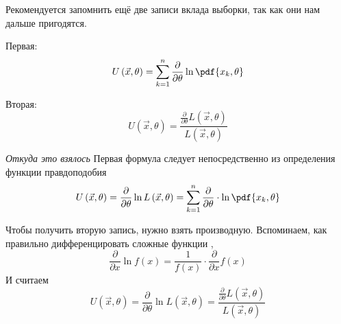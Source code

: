 \begin{remark}\label{remark:defU}
  Рекомендуется запомнить ещё две записи вклада выборки, так как они нам
  дальше пригодятся.

  Первая:
  \begin{align*}
    U\left( \vec{x},\theta \right)
    = \sum_{k=1}^n\frac{\partial}{\partial\theta}\ln{\pdf{x_k,\theta}}
  \end{align*}

  Вторая:
  $$U\left( \vec{x},\theta \right)
    = \frac{\frac{\partial}{\partial\theta}L\left(\vec{x},\theta\right)}
      {L\left(\vec{x},\theta\right)}$$
\end{remark}
\textit{Откуда это взялось}
Первая формула следует непосредственно из определения функции правдоподобия
$$U\left( \vec{x},\theta \right)
    = \frac{\partial}{\partial\theta}\ln{L\left(\vec{x},\theta\right)}
    = \sum_{k=1}^n
      \frac{\partial}{\partial\theta}\cdot\ln{\pdf{x_k,\theta}}$$

Чтобы получить вторую запись, нужно взять производную.
Вспоминаем, как правильно дифференцировать сложные функции
\cite[с.~226]{Fichtenholz1}, \cite[с.~133]{DorogovtsevMA}
$$\frac{\partial}{\partial x} \ln{f\left( x \right)}
  = \frac{1}{f\left( x \right)}
    \cdot \frac{\partial}{\partial x} f\left( x \right)$$
И считаем
$$U\left( \vec{x},\theta \right)
  = \frac{\partial}{\partial\theta}\ln{L\left(\vec{x},\theta\right)}
  = \frac{\frac{\partial}{\partial\theta}L\left(\vec{x},\theta\right)}
    {L\left(\vec{x},\theta\right)}$$

